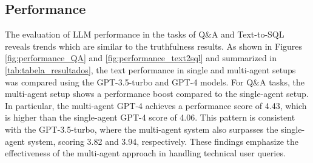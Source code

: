             
            
            
        \subsection{Performance}        
        
            The evaluation of LLM performance \citep{Li2023} in the tasks of Q\&A and Text-to-SQL reveals trends which are similar to the truthfulness results. 
            As shown in Figures \ref{fig:performance_QA} and \ref{fig:performance_text2sql} and summarized in \ref{tab:tabela_resultados}, the text performance in single and multi-agent setups was compared using the GPT-3.5-turbo and GPT-4 models.        
            For Q\&A tasks, the multi-agent setup shows a performance boost compared to the single-agent setup. In particular, the multi-agent GPT-4 achieves a performance score of 4.43, which is higher than the single-agent GPT-4 score of 4.06. This pattern is consistent with the GPT-3.5-turbo, where the multi-agent system also surpasses the single-agent system, scoring 3.82 and 3.94, respectively. These findings emphasize the effectiveness of the multi-agent approach in handling technical user queries.
                    
